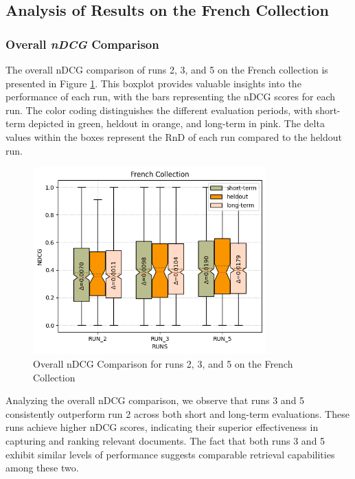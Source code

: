 \subsection{Analysis of Results on the French Collection}
\subsubsection{Overall \textit{nDCG} Comparison}  \label{sec:ndcg_comparison_french}

The overall \ac{nDCG} comparison of runs 2, 3, and 5 on the French collection is presented in Figure \ref{fig:overall_ndcg_french_boxplot}. 
This boxplot provides valuable insights into the performance of each run, with the bars representing the \ac{nDCG} scores for each run. 
The color coding distinguishes the different evaluation periods, with short-term depicted in green, heldout in orange, and long-term in pink. 
The delta values within the boxes represent the \ac{RnD} of each run compared to the heldout run.

\begin{figure}[!h]
\centering
\includegraphics[width=0.8\textwidth]{figure/StatisticalAnalysis/BoxPlot/NDGC French.png}
\caption{Overall \ac{nDCG} Comparison for runs 2, 3, and 5 on the French Collection}
\label{fig:overall_ndcg_french_boxplot}
\end{figure}

Analyzing the overall \ac{nDCG} comparison, we observe that runs 3 and 5 consistently outperform run 2 across both short and long-term evaluations. 
These runs achieve higher \ac{nDCG} scores, indicating their superior effectiveness in capturing and ranking relevant documents. 
The fact that both runs 3 and 5 exhibit similar levels of performance suggests comparable retrieval capabilities among these two.

